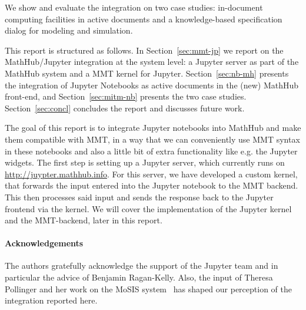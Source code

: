 We show and evaluate the integration on two case studies: in-document computing facilities in active documents and a knowledge-based specification dialog for modeling and simulation. 

This report is structured as follows. In Section~\ref{sec:mmt-jp} we report on the MathHub/Jupyter integration at the system level: a Jupyter server as part of the MathHub system and a MMT kernel for Jupyter. Section~\ref{sec:nb-mh} presents the integration of Jupyter Notebooks as active documents in the (new) MathHub front-end, and Section~\ref{sec:mitm-nb} presents the two case studies. Section~\ref{sec:concl} concludes the report and discusses future work.

The goal of this report is to integrate Jupyter notebooks into MathHub
and make them compatible with MMT, in a way that we can conveniently use 
MMT syntax in these notebooks and also a little bit of extra functionality
like e.g. the Jupyter widgets. The first step is setting up a Jupyter server,
which currently runs on \url{http://juypter.mathhub.info}. 
For this server, we have developed a custom kernel, that forwards the input 
entered into the Jupyter notebook to the MMT backend. This then processes 
said input and sends the response back to the Jupyter frontend via the kernel.
We will cover the implementation of the Jupyter kernel and the MMT-backend,
later in this report.


\paragraph{Acknowledgements} The authors gratefully acknowledge the support of the Jupyter team and in particular the advice of Benjamin Ragan-Kelly. Also, the input of Theresa Pollinger and her work on the MoSIS system~\cite{PolKohKoe:kacse18} has shaped our perception of the integration reported here. 

